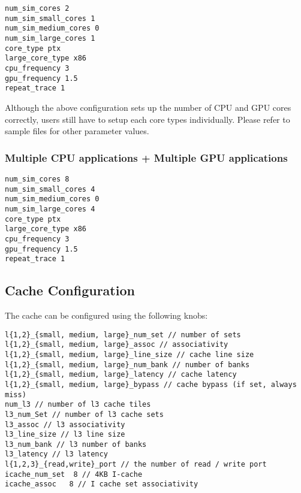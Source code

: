 \begin{Verbatim}
num_sim_cores 2
num_sim_small_cores 1
num_sim_medium_cores 0
num_sim_large_cores 1
core_type ptx
large_core_type x86
cpu_frequency 3
gpu_frequency 1.5
repeat_trace 1
\end{Verbatim}


Although the above configuration sets up the number of CPU and GPU cores
correctly, users still have to setup each core types individually. Please refer
to sample files for other parameter values.

\subsubsection{Multiple CPU applications + Multiple GPU applications}

\begin{Verbatim}
num_sim_cores 8
num_sim_small_cores 4
num_sim_medium_cores 0
num_sim_large_cores 4
core_type ptx
large_core_type x86
cpu_frequency 3
gpu_frequency 1.5
repeat_trace 1
\end{Verbatim}



\subsection{Cache Configuration}

The cache can be configured using the following knobs:

\begin{Verbatim}
l{1,2}_{small, medium, large}_num_set // number of sets
l{1,2}_{small, medium, large}_assoc // associativity
l{1,2}_{small, medium, large}_line_size // cache line size
l{1,2}_{small, medium, large}_num_bank // number of banks  
l{1,2}_{small, medium, large}_latency // cache latency
l{1,2}_{small, medium, large}_bypass // cache bypass (if set, always miss)
num_l3 // number of l3 cache tiles
l3_num_Set // number of l3 cache sets
l3_assoc // l3 associativity
l3_line_size // l3 line size
l3_num_bank // l3 number of banks
l3_latency // l3 latency
l{1,2,3}_{read,write}_port // the number of read / write port
icache_num_set  8 // 4KB I-cache 
icache_assoc   8 // I cache set associativity 
\end{Verbatim}


